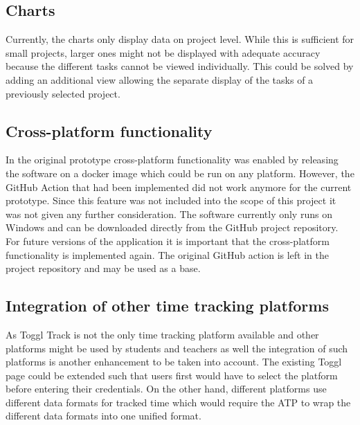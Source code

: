 \subsection{Charts}
Currently, the charts only display data on project level. While this is sufficient for small projects, larger ones might not be displayed with adequate accuracy because the different tasks cannot be viewed individually. This could be solved by adding an additional view allowing the separate display of the tasks of a previously selected project.

\subsection{Cross-platform functionality}
In the original prototype cross-platform functionality was enabled by releasing the software on a docker image which could be run on any platform. However, the GitHub Action that had been implemented did not work anymore for the current prototype. Since this feature was not included into the scope of this project it was not given any further consideration. The software currently only runs on Windows and can be downloaded directly from the GitHub project repository. For future versions of the application it is important that the cross-platform functionality is implemented again. The original GitHub action is left in the project repository and may be used as a base.

\subsection{Integration of other time tracking platforms}
As Toggl Track is not the only time tracking platform available and other platforms might be used by students and teachers as well the integration of such platforms is another enhancement to be taken into account. The existing Toggl page could be extended such that users first would have to select the platform before entering their credentials. On the other hand, different platforms use different data formats for tracked time which would require the ATP to wrap the different data formats into one unified format.